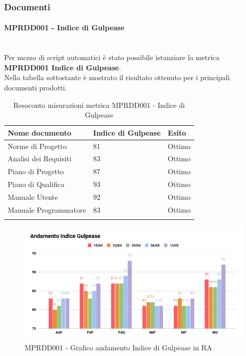 \subsubsection{Documenti}
\paragraph{MPRDD001 - Indice di Gulpease}\mbox{}\\[0.4cm]
Per mezzo di script automatici è stato possibile istanziare la metrica  \textbf{MPRDD001 Indice di Gulpease}.\\
Nella tabella sottostante è mostrato il risultato ottenuto per i principali documenti prodotti.
\begin{center}%
	\centering
	\renewcommand{\arraystretch}{1.5}
	\begin{longtable}{  p{5cm}  p{5cm} p{3cm}  }
		\rowcolor{tableHeadYellow}
		\textbf{Nome documento}   & \textbf{Indice di \mbox{Gulpease}} & \textbf{Esito} \\ 
		\endhead
		Norme di Progetto         & 81                                 & Ottimo \\
		Analisi dei Requisiti     & 83                                 & Ottimo \\
		Piano di Progetto         & 87                                & Ottimo \\
		Piano di Qualifica        & 93                                 & Ottimo \\
		Manuale Utente  	& 92 & Ottimo \\
		Manuale Programmatore & 83 & Ottimo \\
		\rowcolor{white}
		\caption{Resoconto misurazioni metrica MPRDD001 - Indice di Gulpease}
	\end{longtable}
	\begin{figure}[H]
		\centering
		\includegraphics[width=13cm,keepaspectratio]{../includes/pics/Indice_GulpeaseRA.png}
		\caption{\label{fig:mission}MPRDD001 - Grafico andamento Indice di Gulpease in RA}
	\end{figure}
\end{center}
